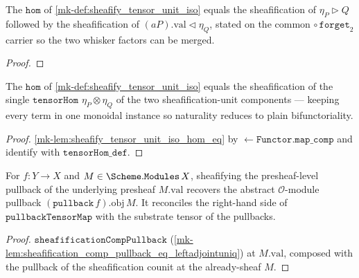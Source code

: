 \begin{lemma}\label{mk-lem:sheafify_tensor_unit_iso_hom_eq}
  \leanok

  The \(\mathtt{hom}\) of \ref{mk-def:sheafify_tensor_unit_iso} equals the sheafification of
  \(\eta_P \rhd Q\) followed by the sheafification of \((aP).\mathrm{val} \lhd \eta_Q\),
  stated on the common \(\circ\,\mathtt{forget}_2\) carrier so the two whisker factors can
  be merged.
\end{lemma}
\begin{proof}
  \leanok

\end{proof}

\begin{lemma}\label{mk-lem:sheafify_tensor_unit_iso_hom_eq_prime}
  \leanok

  The \(\mathtt{hom}\) of \ref{mk-def:sheafify_tensor_unit_iso} equals the sheafification of
  the single \(\mathtt{tensorHom}\) \(\eta_P \otimes \eta_Q\) of the two sheafification-unit
  components --- keeping every term in one monoidal instance so naturality reduces to plain
  bifunctoriality.
\end{lemma}
\begin{proof}
  \leanok
  \ref{mk-lem:sheafify_tensor_unit_iso_hom_eq} by \(\mathtt{\leftarrow Functor.map\_comp}\)
  and identify with \(\mathtt{tensorHom\_def}\).
\end{proof}

\begin{definition}\label{mk-def:pullback_val_iso}
  \leanok

  For \(f : Y \to X\) and \(M \in \Scheme.\mathtt{Modules}\,X\), sheafifying the
  presheaf-level pullback of the underlying presheaf \(M.\mathrm{val}\) recovers the
  abstract \(\mathcal{O}\)-module pullback \((\mathtt{pullback}\,f).\mathrm{obj}\,M\). It
  reconciles the right-hand side of \(\mathtt{pullbackTensorMap}\) with the substrate
  tensor of the pullbacks.
\end{definition}
\begin{proof}
  \leanok
  \(\mathtt{sheafificationCompPullback}\) (\ref{mk-lem:sheafification_comp_pullback_eq_leftadjointuniq})
  at \(M.\mathrm{val}\), composed with the pullback of the sheafification counit at the
  already-sheaf \(M\).
\end{proof}

